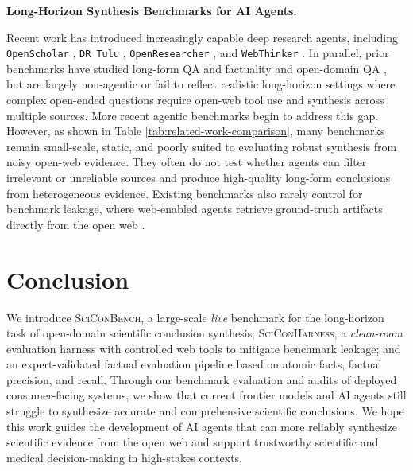 \documentclass{article}
\newcommand{\xhdr}[1]{%
  \noindent\textbf{#1.}
}
\begin{document}
\xhdr{Long-Horizon Synthesis Benchmarks for AI Agents}
Recent work has introduced increasingly capable deep research agents, including \texttt{OpenScholar} \cite{Asai2024OpenScholarSS}, \texttt{DR Tulu} \cite{shao2025drtulureinforcementlearning},  \texttt{OpenResearcher} \cite{zheng-etal-2024-helpful}, and \texttt{WebThinker} \cite{Li2025WebThinker}. In parallel, prior benchmarks have studied long-form QA and factuality \cite{fan-etal-2019-eli5, liu-etal-2025-verifact, min-etal-2023-factscore, stelmakh-etal-2022-asqa} and open-domain QA \cite{amouyal-etal-2023-qampari, 10.5555/3737916.3740483}, but are largely non-agentic or fail to reflect realistic long-horizon settings where complex open-ended questions require open-web tool use and synthesis across multiple sources. More recent agentic benchmarks \cite{cheng2025facts, dammu2026iagentbench, polzak2025can, wan2026deep, wei2024measuring, wei2025browsecomp, wu2025webwalker} begin to address this gap. However, as shown in Table \ref{tab:related-work-comparison}, many benchmarks remain small-scale, static, and poorly suited to evaluating robust synthesis from noisy open-web evidence. They often do not test whether agents can filter irrelevant or unreliable sources and produce high-quality long-form conclusions from heterogeneous evidence. Existing benchmarks also rarely control for benchmark leakage, where web-enabled agents retrieve ground-truth artifacts directly from the open web \cite{anthropic2026evalawareness}. 




\section{Conclusion}

We introduce \textsc{SciConBench}, a large-scale \textit{live} benchmark for the long-horizon task of open-domain scientific conclusion synthesis; \textsc{SciConHarness}, a \textit{clean-room} evaluation harness with controlled web tools to mitigate benchmark leakage; and an expert-validated factual evaluation pipeline based on atomic facts, factual precision, and recall. Through our benchmark evaluation and audits of deployed consumer-facing systems, we show that current frontier models and AI agents still struggle to synthesize accurate and comprehensive scientific conclusions. We hope this work guides the development of  AI agents that can more reliably synthesize scientific evidence from the open web and support trustworthy scientific and medical decision-making in high-stakes contexts. 
\end{document}
